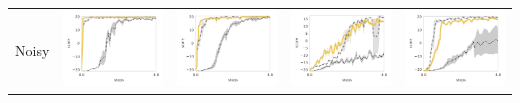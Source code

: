 \begin{table}
\begin{tabular}{m{} >{\centering}m{} >{\centering}m{} >{\centering}m{} >{\centering\arraybackslash}m{} }
	Noisy &
        \includegraphics[width=.22\textwidth]{figures/app_plots/pongs/pong_noise/pong_noise} &
        \includegraphics[width=.22\textwidth]{figures/app_plots/pongs/pong_noise/pong_v_flip} &
        \includegraphics[width=.22\textwidth]{figures/app_plots/pongs/pong_noise/pong_white} &
        \includegraphics[width=.22\textwidth]{figures/app_plots/pongs/pong_noise/pong_zoom} \\


\end{tabular}
\end{table}
